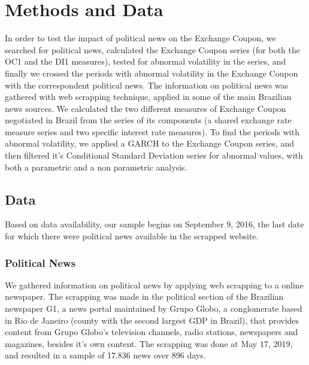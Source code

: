 \documentclass[a4paper]{article}
\begin{document}
\section{Methods and Data}

In order to test the impact of political news on the Exchange Coupon, we searched for political news, calculated the Exchange Coupon series (for both the OC1 and the DI1 measures), tested for abnormal volatility in the series, and finally we crossed the periods with abnormal volatility in the Exchange Coupon with the correspondent political news. The information on political news was gathered with web scrapping technique, applied in some of the main Brazilian news sources. We calculated the two different measures of Exchange Coupon negotiated in Brazil from the series of its components (a shared exchange rate measure series and two specific interest rate measures). To find the periods with abnormal volatility, we applied a GARCH to the Exchange Coupon series, and then filtered it's Conditional Standard Deviation series for abnormal values, with both a parametric and a non parametric analysis.


\subsection{Data}

Based on data availability, our sample begins on September 9, 2016, the last date for which there were political news available in the scrapped website.

\subsubsection{Political News}

We gathered information on political news by applying web scrapping to a online newspaper. The scrapping was made in the political section of the Brazilian newspaper G1, a news portal maintained by Grupo Globo, a conglomerate based in Rio de Janeiro (county with the second largest GDP in Brazil), that provides content from Grupo Globo's television channels, radio stations, newspapers and magazines, besides it's own content. The scrapping was done at May 17, 2019, and resulted in a sample of 17.836 news over 896 days.

\end{document}
